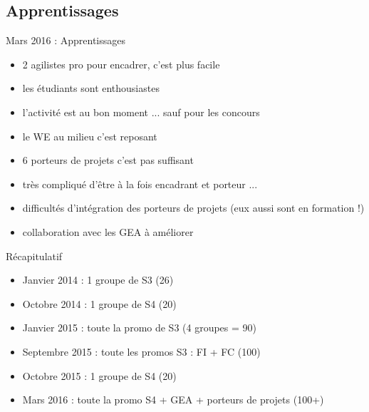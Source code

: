 \documentclass{beamer}
\begin{document}
\subsection{Apprentissages}
\begin{frame}{Mars 2016 : Apprentissages}
  \begin{itemize}
    \item 2 agilistes pro pour encadrer, c'est plus facile
    \item les étudiants sont enthousiastes
    \item l'activité est au bon moment ... sauf pour les concours
    \item le WE au milieu c'est reposant
    \item 6 porteurs de projets c'est pas suffisant
    \item très compliqué d'être à la fois encadrant et porteur ...
    \item difficultés d'intégration des porteurs de projets (eux aussi sont en formation !)
    \item collaboration avec les GEA à améliorer
  \end{itemize}
\end{frame}

\begin{frame}{Récapitulatif}
  \begin{itemize}
    \item Janvier 2014 : 1 groupe de S3 (26)
    \item Octobre 2014 : 1 groupe de S4 (20)
    \item Janvier 2015 : toute la promo de S3 (4 groupes = 90)
    \item Septembre 2015 : toute les promos S3 : FI + FC (100)
    \item Octobre 2015 : 1 groupe de S4 (20)
    \item Mars 2016 : toute la promo S4 + GEA + porteurs de projets (100+)
  \end{itemize}
\end{frame}
\end{document}
